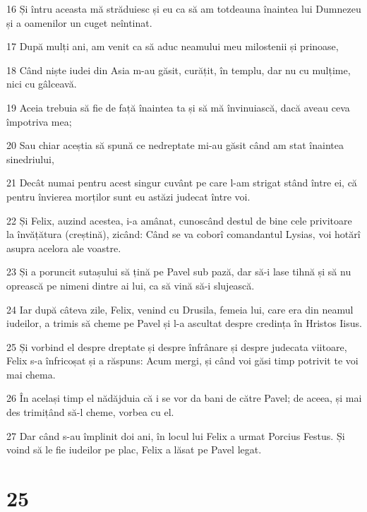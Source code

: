 \par 16 Și întru aceasta mă străduiesc și eu ca să am totdeauna înaintea lui Dumnezeu și a oamenilor un cuget neîntinat.
\par 17 După mulți ani, am venit ca să aduc neamului meu milostenii și prinoase,
\par 18 Când niște iudei din Asia m-au găsit, curățit, în templu, dar nu cu mulțime, nici cu gâlceavă.
\par 19 Aceia trebuia să fie de față înaintea ta și să mă învinuiască, dacă aveau ceva împotriva mea;
\par 20 Sau chiar aceștia să spună ce nedreptate mi-au găsit când am stat înaintea sinedriului,
\par 21 Decât numai pentru acest singur cuvânt pe care l-am strigat stând între ei, că pentru învierea morților sunt eu astăzi judecat între voi.
\par 22 Și Felix, auzind acestea, i-a amânat, cunoscând destul de bine cele privitoare la învățătura (creștină), zicând: Când se va coborî comandantul Lysias, voi hotărî asupra acelora ale voastre.
\par 23 Și a poruncit sutașului să țină pe Pavel sub pază, dar să-i lase tihnă și să nu oprească pe nimeni dintre ai lui, ca să vină să-i slujească.
\par 24 Iar după câteva zile, Felix, venind cu Drusila, femeia lui, care era din neamul iudeilor, a trimis să cheme pe Pavel și l-a ascultat despre credința în Hristos Iisus.
\par 25 Și vorbind el despre dreptate și despre înfrânare și despre judecata viitoare, Felix s-a înfricoșat și a răspuns: Acum mergi, și când voi găsi timp potrivit te voi mai chema.
\par 26 În același timp el nădăjduia că i se vor da bani de către Pavel; de aceea, și mai des trimițând să-l cheme, vorbea cu el.
\par 27 Dar când s-au împlinit doi ani, în locul lui Felix a urmat Porcius Festus. Și voind să le fie iudeilor pe plac, Felix a lăsat pe Pavel legat.

\chapter{25}


